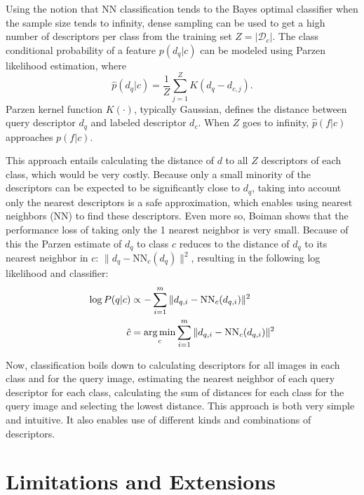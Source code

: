 Using the notion that NN classification tends to the Bayes optimal classifier when the sample size tends to infinity\cite{boiman2008defense, cover1967nearest}, dense sampling can be used to get a high number of descriptors per class from the training set $Z = |\mathcal{D}_c|$. The class conditional probability of a feature $p(d_q|c)$ can be modeled using Parzen likelihood estimation, where
\begin{equation} \label{eq:parzen}
    \hat p(d_q|c) = \frac{1}{Z}\sum_{j=1}^Z K(d_q-d_{c,j}).
\end{equation}
Parzen kernel function $K(\cdot)$, typically Gaussian, defines the distance between query descriptor $d_{q}$ and labeled descriptor $d_{c}$. When $Z$ goes to infinity, $\hat p(f|c)$ approaches $p(f|c)$. 

This approach entails calculating the distance of $d$ to all $Z$ descriptors of each class, which would be very costly. Because only a small minority of the descriptors can be expected to be significantly close to $d_q$, taking into account only the nearest descriptors is a safe approximation, which enables using nearest neighbors (NN) to find these descriptors. Even more so, Boiman shows that the performance loss of taking only the 1 nearest neighbor is very small. Because of this the Parzen estimate of $d_q$ to class $c$ reduces to the distance of $d_q$ to its nearest neighbor in $c$: $\|d_q - \text{NN}_c(d_q)\|^2$, resulting in the following log likelihood and classifier: 
\begin{align}
    \label{eq:nbnnloglikelihood}
    \log P(q|c) &\propto -\sum_{i=1}^m \|d_{q,i} - \text{NN}_c(d_{q,i})\|^2 \\
    \label{eq:nbnnclass}
    \hat c      &= \operatorname*{arg\,min}_c \sum_{i=1}^m \|d_{q,i} - \text{NN}_c(d_{q,i})\|^2
\end{align}

Now, classification boils down to calculating descriptors for all images in each class and for the query image, estimating the nearest neighbor of each query descriptor for each class, calculating the sum of distances for each class for the query image and selecting the lowest distance. This approach is both very simple and intuitive. It also enables use of different kinds and combinations of descriptors.



\section{Limitations and Extensions} %
\label{sub:limitations_and_extensions}

